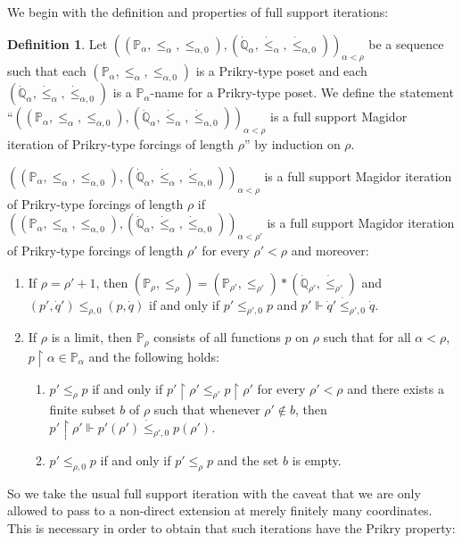 \documentclass[a4paper]{amsart}
\theoremstyle{definition}
\newtheorem{mydef}{Definition}[section]
\theoremstyle{remark}
\theoremstyle{plain}
\numberwithin{mydef}{section}
\newcommand{\dP}{\mathbb{P}}
\newcommand{\dQ}{\mathbb{Q}}
\newcommand{\uhr}{\upharpoonright}
\begin{document}
	We begin with the definition and properties of full support iterations:
	
	\begin{mydef}
		Let $((\dP_{\alpha},\leq_{\alpha},\leq_{\alpha,0}),(\dot{\dQ}_{\alpha},\dot{\leq}_{\alpha},\dot{\leq}_{\alpha,0}))_{\alpha<\rho}$ be a sequence such that each $(\dP_{\alpha},\leq_{\alpha},\leq_{\alpha,0})$ is a Prikry-type poset and each $(\dot{\dQ}_{\alpha},\dot{\leq}_{\alpha},\dot{\leq}_{\alpha,0})$ is a $\dP_{\alpha}$-name for a Prikry-type poset. We define the statement ``$((\dP_{\alpha},\leq_{\alpha},\leq_{\alpha,0}),(\dot{\dQ}_{\alpha},\dot{\leq}_{\alpha},\dot{\leq}_{\alpha,0}))_{\alpha<\rho}$ is a full support Magidor iteration of Prikry-type forcings of length $\rho$'' by induction on $\rho$.
		
		$((\dP_{\alpha},\leq_{\alpha},\leq_{\alpha,0}),(\dot{\dQ}_{\alpha},\dot{\leq}_{\alpha},\dot{\leq}_{\alpha,0}))_{\alpha<\rho}$ is a full support Magidor iteration of Prikry-type forcings of length $\rho$ if $((\dP_{\alpha},\leq_{\alpha},\leq_{\alpha,0}),(\dot{\dQ}_{\alpha},\dot{\leq}_{\alpha},\dot{\leq}_{\alpha,0}))_{\alpha<\rho'}$ is a full support Magidor iteration of Prikry-type forcings of length $\rho'$ for every $\rho'<\rho$ and moreover:
		\begin{enumerate}
			\item If $\rho=\rho'+1$, then $(\dP_{\rho},\leq_{\rho})=(\dP_{\rho'},\leq_{\rho'})*(\dot{\dQ}_{\rho'},\dot{\leq}_{\rho'})$ and $(p',\dot{q}')\leq_{\rho,0}(p,\dot{q})$ if and only if $p'\leq_{\rho',0}p$ and $p'\Vdash\dot{q}'\dot{\leq}_{\rho',0}\dot{q}$.
			\item If $\rho$ is a limit, then $\dP_{\rho}$ consists of all functions $p$ on $\rho$ such that for all $\alpha<\rho$, $p\uhr\alpha\in\dP_{\alpha}$ and the following holds:
			\begin{enumerate}
				\item[(i)] $p'\leq_{\rho}p$ if and only if $p'\uhr\rho'\leq_{\rho'}p\uhr\rho'$ for every $\rho'<\rho$ and there exists a finite subset $b$ of $\rho$ such that whenever $\rho'\notin b$, then $p'\uhr\rho'\Vdash p'(\rho')\dot{\leq}_{\rho',0} p(\rho')$.
				\item[(ii)] $p'\leq_{\rho,0}p$ if and only if $p'\leq_{\rho}p$ and the set $b$ is empty.
			\end{enumerate} 
		\end{enumerate}
	\end{mydef}
	
	So we take the usual full support iteration with the caveat that we are only allowed to pass to a non-direct extension at merely finitely many coordinates. This is necessary in order to obtain that such iterations have the Prikry property:
	
\end{document}
